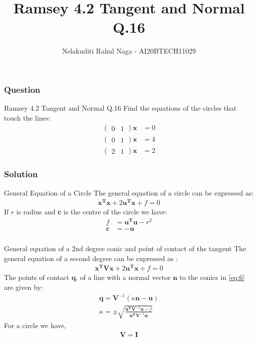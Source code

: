 \documentclass{beamer}
\title{Ramsey 4.2 Tangent and Normal Q.16}
\author{Nelakuditi Rahul Naga - AI20BTECH11029}
\providecommand{\brak}[1]{\ensuremath{\left(#1\right)}}
\newcommand{\myvec}[1]{\ensuremath{\begin{pmatrix}#1\end{pmatrix}}}
\renewcommand{\vec}[1]{\mathbf{#1}}
\begin{document}
\begin{frame}
\titlepage
\end{frame}

\begin{frame}
\frametitle{Question}
\begin{block}{Ramsey 4.2 Tangent and Normal Q.16}
Find the equations of the circles that touch the lines:
\begin{align}
\myvec{0 & 1}\vec{x} &= 0 \label{eq:1}
\\\myvec{0 & 1}\vec{x} &= 4 \label{eq:2}
\\\myvec{2 & 1}\vec{x} &= 2 \label{eq:3}
\end{align}
\end{block}
\end{frame}

\begin{frame}
\frametitle{Solution}
\begin{block}{General Equation of a Circle}
The general equation of a circle can be expressed as:
\begin{align}
\vec{x^T}\vec{x} + 2\vec{u^T}\vec{x} + f = 0 \label{eq:4}
\end{align}
If $r$ is radius and $\vec{c}$ is the centre of the circle we have:
\begin{align}
f &=\vec{u^T}\vec{u}-r^2  \label{eq:5} \\  
\vec{c} &=-\vec{u}
\end{align}
\end{block}
\end{frame}

\begin{frame}
\frametitle{}
\begin{block}{General equation of a 2nd degree conic and point of contact of the tangent}
The general equation of a second degree can be expressed as :
\begin{align}
\vec{x^T}\vec{V}\vec{x}+2\vec{u^T}\vec{x}+f=0\label{eq:6}
\end{align}
The points of contact $\vec{q}$, of a line with a normal vector $\vec{n}$ to the conics in \eqref{eq:6} are given by:
\begin{align}
\vec{q} = \vec{V}^{-1}\brak{\kappa \vec{n}-\vec{u}} \label{eq:7} \\
\kappa = \pm \sqrt{\frac{\vec{u^T}\vec{V}^{-1}\vec{u}-f}{\vec{n^T}\vec{V}^{-1}\vec{n}}}\label{eq:8}
\end{align}
For a circle we have,
\begin{align}
\vec{V} = \vec{I}\label{eq:9} 
\end{align}
\end{block}
\end{frame}
\end{document}
